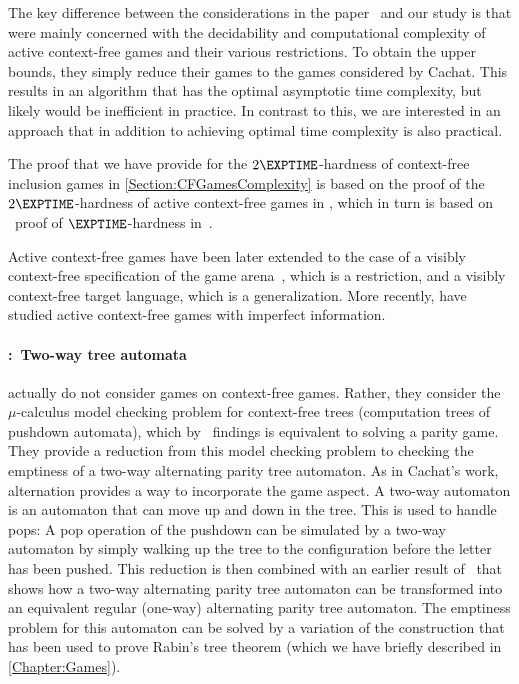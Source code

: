 \documentclass[../../diss.tex]{subfiles}
\begin{document}
The key difference between the considerations in the paper~\cite{MuschollSS06} and our study is that \citeauthor{MuschollSS06} were mainly concerned with the decidability and computational complexity of active context-free games and their various restrictions.
To obtain the upper bounds, they simply reduce their games to the games considered by Cachat.
This results in an algorithm that has the optimal asymptotic time complexity, but likely would be inefficient in practice.
In contrast to this, we are interested in an approach that in addition to achieving optimal time complexity is also practical.

The proof that we have provide for the $2\EXPTIME$-hardness of context-free inclusion games in \cref{Section:CFGamesComplexity} is based on the proof of the $2\EXPTIME$-hardness of active context-free games in \cite{MuschollSS06}, which in turn is based on \Walus~proof of $\EXPTIME$-hardness in~\cite{Walukiewicz01}.

Active context-free games have been later extended to the case of a visibly context-free specification of the game arena~\cite{SchusterS15}, which is a restriction, and a visibly context-free target language, which is a generalization.
More recently,  have studied active context-free games with imperfect information.


\paragraph{\citeauthor{KupfermanV00}:~Two-way tree automata}

 actually do not consider games on context-free games.
Rather, they consider the $\mu$-calculus model checking problem for context-free trees (computation trees of pushdown automata), which by \Walus~findings is equivalent to solving a parity game.
They provide a reduction from this model checking problem to checking the emptiness of a two-way alternating parity tree automaton.
As in Cachat's work, alternation provides a way to incorporate the game aspect.
A two-way automaton is an automaton that can move up and down in the tree.
This is used to handle pops: A pop operation of the pushdown can be simulated by a two-way automaton by simply walking up the tree to the configuration before the letter has been pushed.
This reduction is then combined with an earlier result of~ that shows how a two-way alternating parity tree automaton can be transformed into an equivalent regular (one-way) alternating parity tree automaton.
The emptiness problem for this automaton can be solved by a variation of the construction that has been used to prove Rabin's tree theorem (which we have briefly described in \cref{Chapter:Games}).
\end{document}
